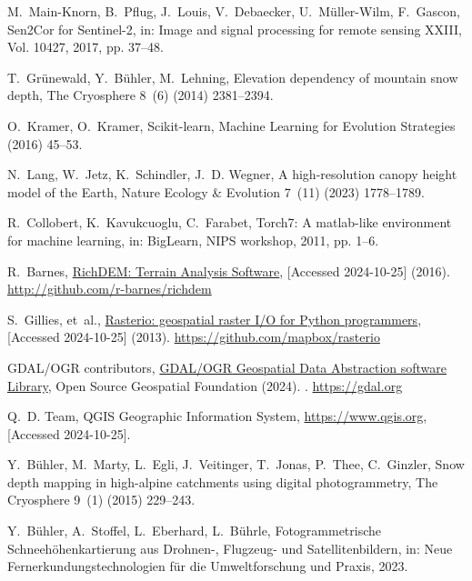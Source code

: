 \documentclass[preprint,12pt]{elsarticle}
\begin{document}
M.~Main-Knorn, B.~Pflug, J.~Louis, V.~Debaecker, U.~M{\"u}ller-Wilm, F.~Gascon, {Sen2Cor for Sentinel-2}, in: Image and signal processing for remote sensing XXIII, Vol. 10427, 2017, pp. 37--48.

T.~Gr\"unewald, Y.~B\"uhler, M.~Lehning, Elevation dependency of mountain snow depth, The Cryosphere 8~(6) (2014) 2381--2394.

O.~Kramer, O.~Kramer, Scikit-learn, Machine Learning for Evolution Strategies (2016) 45--53.

N.~Lang, W.~Jetz, K.~Schindler, J.~D. Wegner, {A high-resolution canopy height model of the Earth}, Nature Ecology \& Evolution 7~(11) (2023) 1778–1789.

R.~Collobert, K.~Kavukcuoglu, C.~Farabet, {Torch7: A matlab-like environment for machine learning}, in: BigLearn, NIPS workshop, 2011, pp. 1--6.

R.~Barnes, \href{http://github.com/r-barnes/richdem}{{RichDEM: Terrain Analysis Software}}, [Accessed 2024-10-25] (2016).
\newline\urlprefix\url{http://github.com/r-barnes/richdem}

S.~Gillies, et~al., \href{https://github.com/mapbox/rasterio}{{Rasterio: geospatial raster I/O for Python programmers}}, [Accessed 2024-10-25] (2013).
\newline\urlprefix\url{https://github.com/mapbox/rasterio}

{GDAL/OGR contributors}, \href{https://gdal.org}{{GDAL/OGR} Geospatial Data Abstraction software Library}, Open Source Geospatial Foundation (2024).
\newblock \href {https://doi.org/10.5281/zenodo.5884351} {}.
\newline\urlprefix\url{https://gdal.org}

Q.~D. Team, {QGIS Geographic Information System}, \url{https://www.qgis.org}, [Accessed 2024-10-25].

Y.~B\"uhler, M.~Marty, L.~Egli, J.~Veitinger, T.~Jonas, P.~Thee, C.~Ginzler, Snow depth mapping in high-alpine catchments using digital photogrammetry, The Cryosphere 9~(1) (2015) 229–243.

Y.~B\"{u}hler, A.~Stoffel, L.~Eberhard, L.~B\"{u}hrle, {Fotogrammetrische Schneeh\"{o}henkartierung aus Drohnen-, Flugzeug- und Satellitenbildern}, in: Neue Fernerkundungstechnologien f\"{u}r die Umweltforschung und Praxis, 2023.
\end{document}
